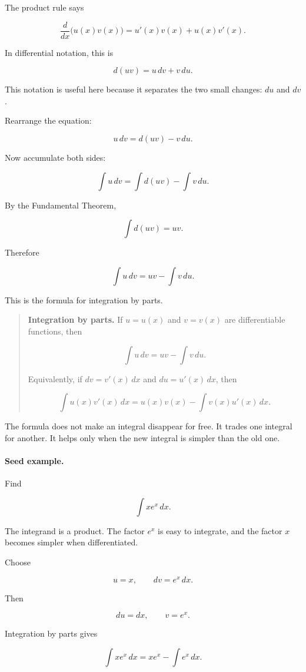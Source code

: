 The product rule says

\[
\frac{d}{dx}\bigl(u(x)v(x)\bigr)
=
u'(x)v(x)+u(x)v'(x).
\]

In differential notation, this is

\[
d(uv)=u\,dv+v\,du.
\]

This notation is useful here because it separates the two small changes: \(du\) and
\(dv\).

Rearrange the equation:

\[
u\,dv=d(uv)-v\,du.
\]

Now accumulate both sides:

\[
\int u\,dv=\int d(uv)-\int v\,du.
\]

By the Fundamental Theorem,

\[
\int d(uv)=uv.
\]

Therefore

\[
\boxed{
\int u\,dv=uv-\int v\,du.
}
\]

This is the formula for integration by parts.

\begin{quote}
\textbf{Integration by parts.}
If \(u=u(x)\) and \(v=v(x)\) are differentiable functions, then

\[
\boxed{
\int u\,dv=uv-\int v\,du.
}
\]

Equivalently, if \(dv=v'(x)\,dx\) and \(du=u'(x)\,dx\), then

\[
\boxed{
\int u(x)v'(x)\,dx
=
u(x)v(x)-\int v(x)u'(x)\,dx.
}
\]
\end{quote}

The formula does not make an integral disappear for free.  It trades one integral for
another.  It helps only when the new integral is simpler than the old one.

\paragraph{Seed example.}
Find

\[
\int x e^x\,dx.
\]

The integrand is a product.  The factor \(e^x\) is easy to integrate, and the factor
\(x\) becomes simpler when differentiated.

Choose

\[
u=x,
\qquad
dv=e^x\,dx.
\]

Then

\[
du=dx,
\qquad
v=e^x.
\]

Integration by parts gives

\[
\int x e^x\,dx
=
x e^x-\int e^x\,dx.
\]

